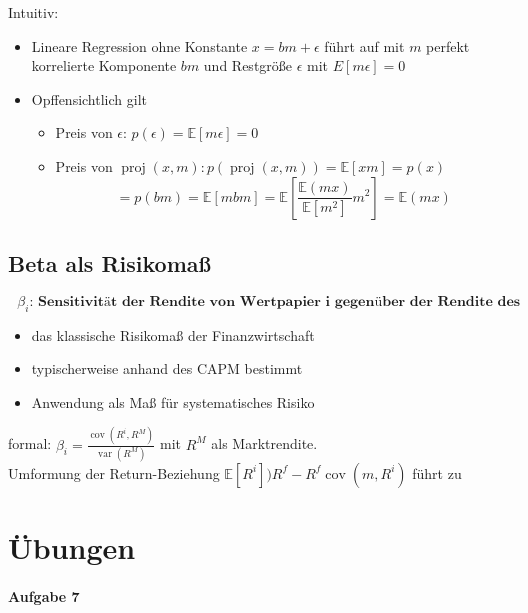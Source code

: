 \documentclass[12pt]{extreport} %
\theoremstyle{named}
\theoremstyle{nnamed}
\theoremstyle{itshape}
\theoremstyle{normal}
\begin{document}
Intuitiv:
\begin{itemize}
	\item Lineare Regression ohne Konstante $x = bm + \epsilon$ führt auf mit $m$ perfekt korrelierte Komponente $bm$ und Restgröße $\epsilon$ mit $E[m\epsilon] = 0$
	\item Opffensichtlich gilt
		\begin{itemize}
			\item Preis von $\epsilon$: $p(\epsilon) = \mathbb{E}[m\epsilon] = 0$
			\item Preis von $\operatorname{proj}(x, m) \colon p(\operatorname{proj}(x, m)) = \mathbb{E}[xm] = p(x)$ $$= p(b m) = \mathbb{E}[m bm] = \mathbb{E} \left[ \frac{\mathbb{E}(mx)}{\mathbb{E}[m^2]} m^2 \right] = \mathbb{E}(mx)$$
		\end{itemize}
\end{itemize}

\section{Beta als Risikomaß}

$$
\textbf{ $\beta_i$: Sensitivität der Rendite von Wertpapier i gegenüber der Rendite des ganzen Marktes}$$
\begin{itemize}
	\item  das klassische Risikomaß der Finanzwirtschaft
	\item typischerweise anhand des CAPM  bestimmt
	\item Anwendung als Maß für systematisches Risiko
\end{itemize}
 

formal: $\beta_i = \frac{\operatorname{cov}(R^i, R^M)}{\operatorname{var}(R^M)}$ mit $R^M$ als Marktrendite. ~\\

Umformung der Return-Beziehung $\mathbb{E}[R^i] ) R^f - R^f \operatorname{cov}(m, R^i)$ führt zu


\appendix
\chapter{Übungen}

\subsubsection*{Aufgabe 7}
\end{document}
